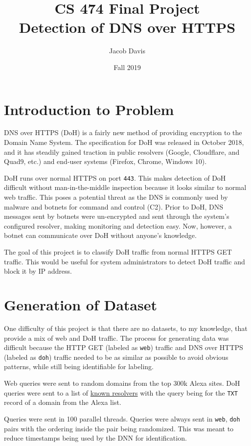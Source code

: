 \documentclass[fleqn,11pt]{article}
\title{\vspace{-2.0cm}CS 474 Final Project\\
        \large Detection of DNS over HTTPS}
\date{Fall 2019}
\author{Jacob Davis}
\begin{document}
\maketitle

\section{Introduction to Problem}
DNS over HTTPS (DoH) is a fairly new method of providing encryption to the Domain Name System. 
The specification for DoH was released in October 2018, and it has steadily gained traction in public resolvers (Google, Cloudflare, and Quad9, etc.) and end-user systems (Firefox, Chrome, Windows 10).

DoH runs over normal HTTPS on port \texttt{443}.
This makes detection of DoH difficult without man-in-the-middle inspection because it looks similar to normal web traffic.
This poses a potential threat as the DNS is commonly used by malware and botnets for command and control (C2). 
Prior to DoH, DNS messages sent by botnets were un-encrypted and sent through the system's configured resolver, making monitoring and detection easy. 
Now, however, a botnet can communicate over DoH without anyone's knowledge.

The goal of this project is to classify DoH traffic from normal HTTPS GET traffic. 
This would be useful for system administrators to detect DoH traffic and block it by IP address.

\section{Generation of Dataset}
One difficulty of this project is that there are no datasets, to my knowledge, that provide a mix of web and DoH traffic. 
The process for generating data was difficult because the HTTP GET (labeled as \texttt{web}) traffic and DNS over HTTPS (labeled as \texttt{doh}) traffic needed to be as similar as possible to avoid obvious patterns, while still being identifiable for labeling. 

Web queries were sent to random domains from the top 300k Alexa sites. 
DoH queries were sent to a list of \href{https://github.com/curl/curl/wiki/DNS-over-HTTPS}{known resolvers} with the query being for the \texttt{TXT} record of a domain from the Alexa list.

Queries were sent in 100 parallel threads. 
Queries were always sent in \texttt{web}, \texttt{doh} pairs with the ordering inside the pair being randomized. 
This was meant to reduce timestamps being used by the DNN for identification.
\end{document}

